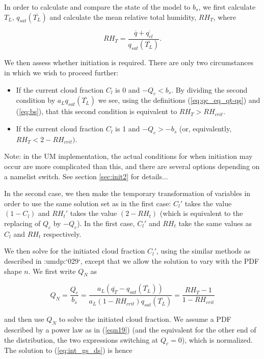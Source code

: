 \documentclass{UMDP_article}
\newcommand{\citeumdp}[1]{:umdp:`#1`}
\begin{document}
In order to calculate and compare the state of the model to $b_s$,
we first calculate $T_L$, $q_{sat}(\overline{T_L})$ and calculate
the mean relative total humidity, $RH_T$, where

\begin{equation}
RH_T = \frac{ \overline{q} + \overline{q_{cl}} } {q_{sat}(\overline{T_L}) } .
\label{eq:rht}
\end{equation}

We then assess whether initiation is required. There are only two
circumstances in which we wish to proceed further:
\begin{itemize}
\item{If the current cloud fraction $C_l$ is 0 and $-Q_c < b_s$. By dividing the second condition by $a_L q_{sat} (\overline{T_L})$ we see, using the definitions (\ref{eq:qc_eq_qt-qs}) and (\ref{eq:bs}), that this second condition is equivalent to $RH_T > RH_{crit}$.}
\item{If the current cloud fraction $C_l$ is 1 and $-Q_c > -b_s$ (or, equivalently, $RH_T < 2 - RH_{crit})$.}
\end{itemize}
Note: in the UM implementation, the actual conditions for when initiation
may occur are more complicated than this, and there are several options
depending on a namelist switch.  See section \ref{sec:init2} for details...

In the second case, we then make the temporary transformation of variables
in order to use the same solution set as in the first case: $C_l'$ takes the
value $(1-C_l)$ and $RH_t'$ takes the value $(2-RH_t)$ (which is equivalent
to the replacing of $Q_c$ by $-Q_c$). In the first case, $C_l'$ and $RH_t$ take
the same values as $C_l$ and $RH_t$ respectively.

We then solve for the initiated cloud fraction $C_l'$, using the similar
methods as described in \citeumdp{029}, except
that we allow the solution to vary with the PDF shape $n$. We first
write $Q_N$ as

\begin{equation}
Q_N = \frac{Q_c}{b_s} = \frac{ a_L (\overline{q_T} - q_{sat}(\overline{T_L})) }
{ a_L (1 - RH_{crit}) q_{sat} (\overline{T_L})} = \frac{RH_T - 1}{1-RH_{crit}}
\label{eq:qn_def}
\end{equation}

and then use $Q_N$ to solve the initiated cloud fraction. We assume a PDF
described by a power law as in (\ref{eqn19}) (and the equivalent for the
other end of the distribution, the two expressions switching at $Q_c=0$),
which is normalized. The solution to (\ref{eq:int_gs_ds}) is hence 
\end{document}
